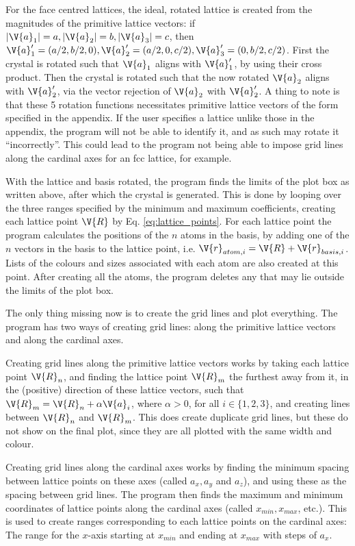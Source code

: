 \documentclass[main.tex]{subfiles}
\begin{document}
	For the face centred lattices, the ideal, rotated lattice is created from the magnitudes of the primitive lattice vectors: if $ |\V{a}_1| = a, |\V{a}_2| = b, |\V{a}_3| = c $, then $ \V{a}'_1 = (a/2, b/2, 0), \V{a}'_2 = (a/2, 0, c/2), \V{a}'_3 = (0, b/2, c/2) $. First the crystal is rotated such that $ \V{a}_1 $ aligns with $ \V{a}'_1 $, by using their cross product. Then the crystal is rotated such that the now rotated $ \V{a}_2 $ aligns with $ \V{a}'_2 $, via the vector rejection of $ \V{a}_2 $ with $ \V{a}'_2 $. A thing to note is that these 5 rotation functions necessitates primitive lattice vectors of the form specified in the appendix. If the user specifies a lattice unlike those in the appendix, the program will not be able to identify it, and as such may rotate it ``incorrectly''. This could lead to the program not being able to impose grid lines along the cardinal axes for an fcc lattice, for example.
	
	With the lattice and basis rotated, the program finds the limits of the plot box as written above, after which the crystal is generated. This is done by looping over the three ranges specified by the minimum and maximum coefficients, creating each lattice point $ \V{R} $ by Eq. \eqref{eq:lattice_points}. For each lattice point the program calculates the positions of the $ n $ atoms in the basis, by adding one of the $ n $ vectors in the basis to the lattice point, i.e. $ \V{r}_{atom, i} = \V{R} + \V{r}_{basis, i} $. Lists of the colours and sizes associated with each atom are also created at this point. After creating all the atoms, the program deletes any that may lie outside the limits of the plot box.
	
	The only thing missing now is to create the grid lines and plot everything. The program has two ways of creating grid lines: along the primitive lattice vectors and along the cardinal axes.
	
	Creating grid lines along the primitive lattice vectors works by taking each lattice point $ \V{R}_n $, and finding the lattice point $ \V{R}_m $ the furthest away from it, in the (positive) direction of these lattice vectors, such that $ \V{R}_m = \V{R}_n + \alpha \V{a}_i $, where $ \alpha > 0 $, for all $ i \in \{1,2,3\}$, and creating lines between $ \V{R}_n $ and $ \V{R}_m $. This does create duplicate grid lines, but these do not show on the final plot, since they are all plotted with the same width and colour.
	
	Creating grid lines along the cardinal axes works by finding the minimum spacing between lattice points on these axes (called $ a_x, a_y$ and $ a_z $), and using these as the spacing between grid lines. The program then finds the maximum and minimum coordinates of lattice points along the cardinal axes (called $x_{min}, x_{max}$, etc.). This is used to create ranges corresponding to each lattice points on the cardinal axes: The range for the $ x $-axis starting at $ x_{min} $  and ending at $ x_{max} $ with steps of $ a_x $.
	
\end{document}
